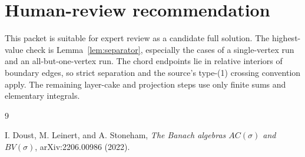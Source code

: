 \documentclass[11pt]{article}
\begin{document}
\section{Human-review recommendation}

This packet is suitable for expert review as a candidate full solution.  The
highest-value check is Lemma~\ref{lem:separator}, especially the cases of a
single-vertex run and an all-but-one-vertex run.  The chord endpoints lie in
relative interiors of boundary edges, so strict separation and the source's
type-(1) crossing convention apply.  The remaining layer-cake and projection
steps use only finite sums and elementary integrals.

\begin{thebibliography}{9}

I. Doust, M. Leinert, and A. Stoneham,
\emph{The Banach algebras $AC(\sigma)$ and $BV(\sigma)$},
arXiv:2206.00986 (2022).

\end{thebibliography}
\end{document}
